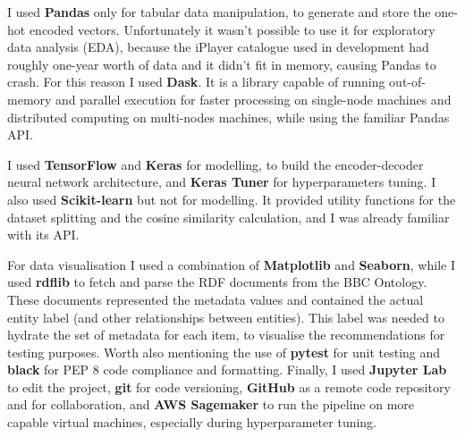 I used \textbf{Pandas} only for tabular data manipulation, to generate and store the one-hot encoded vectors. Unfortunately it wasn't possible
to use it for exploratory data analysis (EDA), because the iPlayer catalogue used in development had roughly one-year worth of data and it didn't
fit in memory, causing Pandas to crash. For this reason I used \textbf{Dask}. It is a library capable of running out-of-memory and
parallel execution for faster processing on single-node machines and distributed computing on multi-nodes machines, while using the familiar Pandas API.

I used \textbf{TensorFlow} and \textbf{Keras} for modelling, to build the encoder-decoder neural network architecture, and \textbf{Keras Tuner} for
hyperparameters tuning. I also used \textbf{Scikit-learn} but not for modelling. It provided utility functions for the dataset splitting and
the cosine similarity calculation, and I was already familiar with its API.

For data visualisation I used a combination of \textbf{Matplotlib} and \textbf{Seaborn}, while I used \textbf{rdflib} to fetch and parse
the RDF documents from the BBC Ontology. These documents represented the metadata values and contained the actual entity label (and other
relationships between entities).
This label was needed to hydrate the set of metadata for each item, to visualise the recommendations for testing purposes.
Worth also mentioning the use of \textbf{pytest} for unit testing and \textbf{black} for PEP 8 code compliance and formatting.
Finally, I used \textbf{Jupyter Lab} to edit the project, \textbf{git} for code versioning, \textbf{GitHub} as a remote code repository
and for collaboration, and \textbf{AWS Sagemaker} to run the pipeline on more capable virtual machines, especially during hyperparameter tuning.
